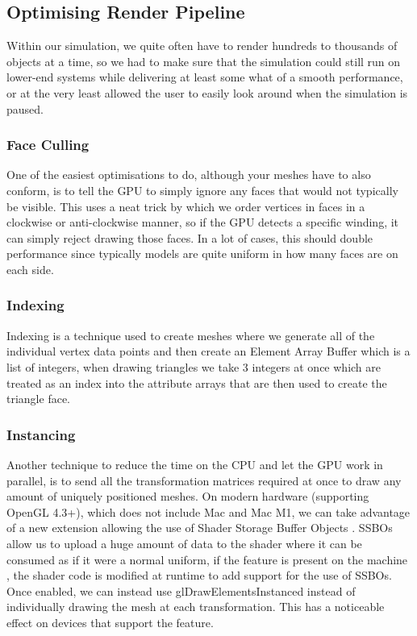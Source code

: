 \documentclass{article}
\begin{document}
\begin{multicols}{2}
            \subsection{Optimising Render Pipeline}

                Within our simulation, we quite often have to render hundreds to thousands of objects at a time, so we had to make sure that the simulation could still run on lower-end systems while delivering at least some what of a smooth performance, or at the very least allowed the user to easily look around when the simulation is paused.

                \subsubsection{Face Culling}

                    One of the easiest optimisations to do, although your meshes have to also conform, is to tell the GPU to simply ignore any faces that would not typically be visible. This uses a neat trick by which we order vertices in faces in a clockwise or anti-clockwise manner, so if the GPU detects a specific winding, it can simply reject drawing those faces. In a lot of cases, this should double performance since typically models are quite uniform in how many faces are on each side.

                \subsubsection{Indexing}

                    Indexing is a technique used to create meshes where we generate all of the individual vertex data points and then create an Element Array Buffer which is a list of integers, when drawing triangles we take 3 integers at once which are treated as an index into the attribute arrays that are then used to create the triangle face.

                \subsubsection{Instancing}

                    Another technique to reduce the time on the CPU and let the GPU work in parallel, is to send all the transformation matrices required at once to draw any amount of uniquely positioned meshes. On modern hardware (supporting OpenGL 4.3+), which does not include Mac and Mac M1, we can take advantage of a new extension allowing the use of Shader Storage Buffer Objects \cite{ssbo}. SSBOs allow us to upload a huge amount of data to the shader where it can be consumed as if it were a normal uniform, if the feature is present on the machine \cite{extension-list}, the shader code is modified at runtime to add support for the use of SSBOs. Once enabled, we can instead use glDrawElementsInstanced instead of individually drawing the mesh at each transformation. This has a noticeable effect on devices that support the feature.


\end{multicols}
\end{document}
